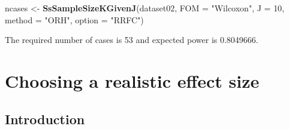 \documentclass[]{book}
\newenvironment{Shaded}{\begin{snugshade}}{\end{snugshade}}
\newcommand{\DataTypeTok}[1]{\textcolor[rgb]{0.13,0.29,0.53}{#1}}
\newcommand{\DecValTok}[1]{\textcolor[rgb]{0.00,0.00,0.81}{#1}}
\newcommand{\KeywordTok}[1]{\textcolor[rgb]{0.13,0.29,0.53}{\textbf{#1}}}
\newcommand{\NormalTok}[1]{#1}
\newcommand{\StringTok}[1]{\textcolor[rgb]{0.31,0.60,0.02}{#1}}
\begin{document}
\begin{Shaded}
\begin{Highlighting}[]
\NormalTok{ncases <-}\StringTok{ }\KeywordTok{SsSampleSizeKGivenJ}\NormalTok{(dataset02, }\DataTypeTok{FOM =} \StringTok{"Wilcoxon"}\NormalTok{, }\DataTypeTok{J =} \DecValTok{10}\NormalTok{, }\DataTypeTok{method =} \StringTok{"ORH"}\NormalTok{, }\DataTypeTok{option =} \StringTok{"RRFC"}\NormalTok{)}
\end{Highlighting}
\end{Shaded}

The required number of cases is 53 and expected power is 0.8049666.

\hypertarget{SSJafrocEffectSize}{%
\chapter{Choosing a realistic effect size}\label{SSJafrocEffectSize}}

\hypertarget{introduction-10}{%
\section{Introduction}\label{introduction-10}}
\end{document}
